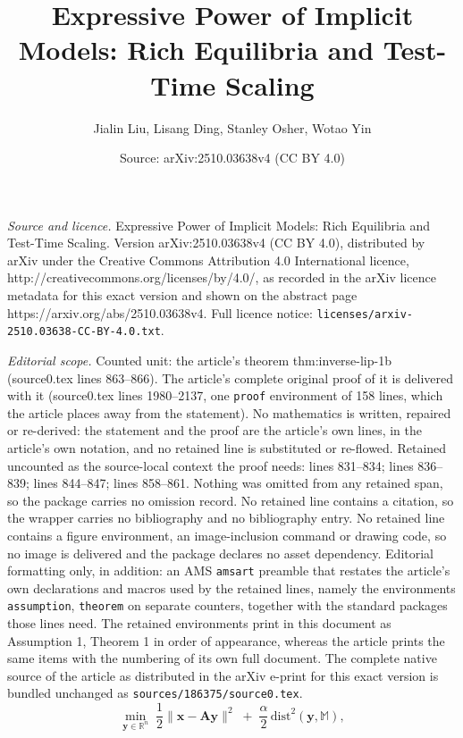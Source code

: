 \documentclass[10pt,a4paper]{amsart}
\title{Expressive Power of Implicit Models: Rich Equilibria and Test-Time Scaling}
\author{Jialin Liu, Lisang Ding, Stanley Osher, Wotao Yin}
\date{Source: arXiv:2510.03638v4 (CC BY 4.0)}
\def\mA{{\bm{A}}}
\def\sM{{\mathbb{M}}}
\def\sR{{\mathbb{R}}}
\def\vx{{\bm{x}}}
\def\vy{{\bm{y}}}
\begin{document}
\maketitle

\noindent\emph{Source and licence.} Expressive Power of Implicit Models: Rich Equilibria and Test-Time Scaling. Version arXiv:2510.03638v4 (CC BY 4.0), distributed by arXiv under the Creative Commons Attribution 4.0 International licence, http://creativecommons.org/licenses/by/4.0/, as recorded in the arXiv licence metadata for this exact version and shown on the abstract page https://arxiv.org/abs/2510.03638v4. Full licence notice: \texttt{licenses/arxiv-2510.03638-CC-BY-4.0.txt}.\par\smallskip

\noindent\textit{Editorial scope.} Counted unit: the article's theorem thm:inverse-lip-1b (source0.tex lines 863--866). The article's complete original proof of it is delivered with it (source0.tex lines 1980--2137, one \texttt{proof} environment of 158 lines, which the article places away from the statement). No mathematics is written, repaired or re-derived: the statement and the proof are the article's own lines, in the article's own notation, and no retained line is substituted or re-flowed.  Retained uncounted as the source-local context the proof needs: lines 831--834; lines 836--839; lines 844--847; lines 858--861.  Nothing was omitted from any retained span, so the package carries no omission record.  No retained line contains a citation, so the wrapper carries no bibliography and no bibliography entry.  No retained line contains a figure environment, an image-inclusion command or drawing code, so no image is delivered and the package declares no asset dependency.  Editorial formatting only, in addition: an AMS \texttt{amsart} preamble that restates the article's own declarations and macros used by the retained lines, namely the environments \texttt{assumption}, \texttt{theorem} on separate counters, together with the standard packages those lines need.  The retained environments print in this document as Assumption 1, Theorem 1 in order of appearance, whereas the article prints the same items with the numbering of its own full document.  The complete native source of the article as distributed in the arXiv e-print for this exact version is bundled unchanged as \texttt{sources/186375/source0.tex}.
\begin{equation}
\label{eq:mapping-1a}
\min_{\vy\in\sR^n}\;\frac{1}{2}\|\vx-\mA\vy\|^2 \;+\; \frac{\alpha}{2}\,\mathrm{dist}^2(\vy,\sM),
\end{equation}
\end{document}
